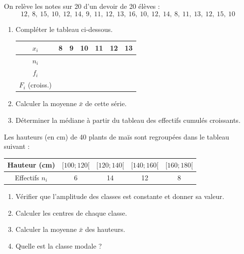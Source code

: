 \documentclass[11pt]{article}
\begin{document}
\begin{exercice}
On relève les notes sur 20 d'un devoir de 20 élèves :
\[ 12,\ 8,\ 15,\ 10,\ 12,\ 14,\ 9,\ 11,\ 12,\ 13,\ 16,\ 10,\ 12,\ 14,\ 8,\ 11,\ 13,\ 12,\ 15,\ 10 \]
\begin{enumerate}
    \item Compléter le tableau ci-dessous.
    \begin{center}
    \begin{tabular}{|c|c|c|c|c|c|c|}
    \hline
    $x_i$ & 8 & 9 & 10 & 11 & 12 & 13 \\ \hline
    $n_i$ &   &   &    &    &    &    \\ \hline
    $f_i$ &   &   &    &    &    &    \\ \hline
    $F_i$ (croiss.) &   &   &    &    &    &    \\ \hline
    \end{tabular}
    \end{center}
    \item Calculer la moyenne $\bar{x}$ de cette série.
    \item Déterminer la médiane à partir du tableau des effectifs cumulés croissants.
\end{enumerate}
\end{exercice}

\begin{exercice}
Les hauteurs (en cm) de 40 plants de maïs sont regroupées dans le tableau suivant :
\begin{center}
\begin{tabular}{|c|c|c|c|c|}
\hline
Hauteur (cm) & $[100; 120[$ & $[120; 140[$ & $[140; 160[$ & $[160; 180[$ \\ \hline
Effectifs $n_i$ & 6 & 14 & 12 & 8 \\ \hline
\end{tabular}
\end{center}
\begin{enumerate}
    \item Vérifier que l'amplitude des classes est constante et donner sa valeur.
    \item Calculer les centres de chaque classe.
    \item Calculer la moyenne $\bar{x}$ des hauteurs.
    \item Quelle est la classe modale ?
\end{enumerate}
\end{exercice}
\end{document}
